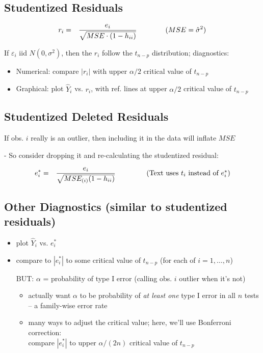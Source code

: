 \documentclass[12pt]{../notes}
\begin{document}
\subsection{Studentized Residuals}
\begin{eqnarray}
r_i & = & \frac{e_i}{\sqrt{MSE \cdot (1-h_{ii})}}  \mbox{\hspace{4em}} (MSE = \hat{\sigma}^2) \nonumber
\end{eqnarray}

If $\varepsilon_i$ iid $N(0,\sigma^2)$, then the $r_i$ follow the $t_{n-p}$ distribution; diagnostics:
\begin{itemize}
  \item Numerical: compare $|r_i|$ with upper $\alpha/2$ critical value of $t_{n-p}$
  \item Graphical: plot $\hat{Y}_i$ vs. $r_i$, with ref. lines at upper $\alpha/2$ critical value of $t_{n-p}$
\end{itemize}

\subsection{Studentized Deleted Residuals}
If obs. $i$ really is an outlier, then including it in the data will inflate $MSE$

 - So consider dropping it and re-calculating the studentized residual:

\begin{eqnarray}
e^*_i & = & \frac{e_i}{\sqrt{MSE_{(i)} (1-h_{ii})}} \mbox{\hspace{4em} (Text uses $t_i$ instead of $e^*_i$)} \nonumber
\end{eqnarray}

\subsection{Other Diagnostics (similar to studentized residuals)}
\begin{itemize}
  \item plot $\hat{Y}_i$ vs. $e^*_i$
  \item compare to $|e^*_i|$ to some critical value of $t_{n-p}$  (for each of $i=1,\ldots,n$)\\

\vspace{-.5em}

   BUT:  $\alpha$ = probability of type I error (calling obs. $i$ outlier when it's not)
    \begin{itemize}
      \item actually want $\alpha$ to be probability of {\it at least one} type I error in all $n$ tests\\
        -- a family-wise error rate
      \item many ways to adjust the critical value; here,  we'll use Bonferroni correction:\\

      compare $|e^*_i|$ to upper $\alpha/(2 n)$ critical value of $t_{n-p}$
    \end{itemize}

\end{itemize}
\end{document}

